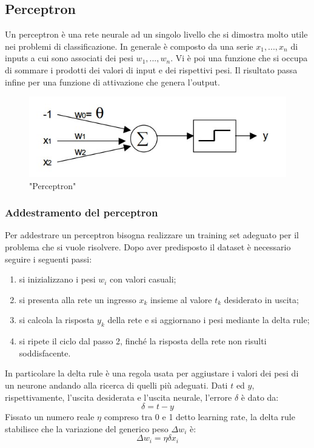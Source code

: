 \documentclass[a4paper,11pt]{article}
\begin{document}
    \subsection{Perceptron}
    Un perceptron è una rete neurale ad un singolo livello che si dimostra molto utile nei problemi di classificazione.
    In generale è composto da una serie $x_1, ..., x_n$ di inputs a cui sono associati dei pesi $w_1, ..., w_n$. 
    Vi è poi una funzione che si occupa di sommare i prodotti dei valori di input e dei rispettivi pesi. 
    Il risultato passa infine per una funzione di attivazione che genera l'output.
    \begin{figure}[h]
        \centering
        \includegraphics{perceptron.jpg}
        \caption{"Perceptron"}
    \end{figure}
  
    \subsubsection{Addestramento del perceptron}
    Per addestrare un perceptron bisogna realizzare un training set adeguato per il problema che si vuole risolvere. 
    Dopo aver predisposto il dataset è necessario seguire i seguenti passi:
    \begin{enumerate}
        \item si inizializzano i pesi $w_i$ con valori casuali;
        \item si presenta alla rete un ingresso $x_k$ insieme al valore $t_k$ desiderato in uscita;
        \item si calcola la risposta $y_k$ della rete e si aggiornano i pesi mediante la delta rule;
        \item si ripete il ciclo dal passo 2, finché la risposta della rete non risulti soddisfacente.
    \end{enumerate}

    In particolare la delta rule è una regola usata per aggiustare i valori dei pesi di un neurone andando alla ricerca di quelli più adeguati.
    Dati $t$ ed $y$, rispettivamente, l'uscita desiderata e l'uscita neurale, l'errore $\delta$ è dato da:
    $$ \delta = t-y $$
    Fissato un numero reale $\eta$ compreso tra 0 e 1 detto learning rate, la delta rule stabilisce che la variazione del generico peso $\Delta w_i$ è:
    $$ \Delta w_i = \eta \delta x_i $$
\end{document}

